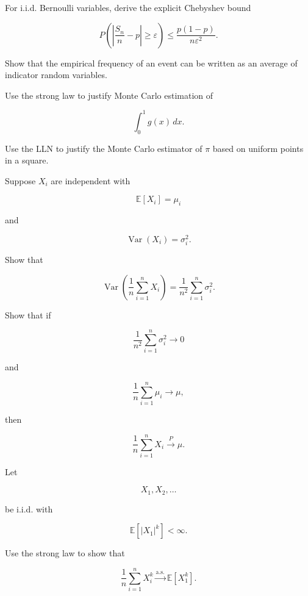 \begin{exercise}[3]
For i.i.d. Bernoulli variables, derive the explicit Chebyshev bound

\[
P
\left(
\left|
\frac{S_n}{n}-p
\right|
\geq
\varepsilon
\right)
\leq
\frac{
p(1-p)
}{
n\varepsilon^2
}.
\]
\end{exercise}

\begin{exercise}[3]
Show that the empirical frequency of an event can be written as an
average of indicator random variables.
\end{exercise}

\begin{exercise}[3]
Use the strong law to justify Monte Carlo estimation of

\[
\int_0^1g(x)\,dx.
\]
\end{exercise}

\begin{exercise}[3]
Use the LLN to justify the Monte Carlo estimator of \(\pi\) based on
uniform points in a square.
\end{exercise}

\begin{exercise}[3]
Suppose \(X_i\) are independent with

\[
\mathbb{E}[X_i]=\mu_i
\]

and

\[
\operatorname{Var}(X_i)=\sigma_i^2.
\]

Show that

\[
\operatorname{Var}
\left(
\frac1n
\sum_{i=1}^{n}X_i
\right)
=
\frac1{n^2}
\sum_{i=1}^{n}\sigma_i^2.
\]
\end{exercise}

\begin{exercise}[3]
Show that if

\[
\frac1{n^2}
\sum_{i=1}^{n}\sigma_i^2
\to0
\]

and

\[
\frac1n
\sum_{i=1}^{n}\mu_i
\to\mu,
\]

then

\[
\frac1n
\sum_{i=1}^{n}X_i
\xrightarrow{P}
\mu.
\]
\end{exercise}

\begin{exercise}[3]
Let

\[
X_1,X_2,\ldots
\]

be i.i.d. with

\[
\mathbb{E}[|X_1|^k]<\infty.
\]

Use the strong law to show that

\[
\frac1n
\sum_{i=1}^{n}X_i^k
\xrightarrow{\text{a.s.}}
\mathbb{E}[X_1^k].
\]
\end{exercise}

